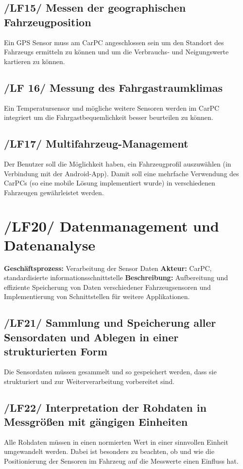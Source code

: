 \subsection{/LF15/ Messen der geographischen Fahrzeugposition}
\nextline
Ein GPS Sensor muss am CarPC angeschlossen sein um den Standort des Fahrzeugs ermitteln zu können und um die Verbrauchs- und Neigungswerte kartieren zu können.

\subsection{/LF 16/ Messung des Fahrgastraumklimas}
\nextline
Ein Temperatursensor und mögliche weitere Sensoren werden im CarPC integriert um die Fahrgastbequemlichkeit besser beurteilen zu können.

\subsection{/LF17/ Multifahrzeug-Management}
\nextline
Der Benutzer soll die Möglichkeit haben, ein Fahrzeugprofil auszuwählen (in Verbindung mit der Android-App). Damit soll eine mehrfache Verwendung des CarPCs (so eine mobile Lösung implementiert wurde) in verschiedenen Fahrzeugen gewährleistet werden.
\newpage

\section{/LF20/ Datenmanagement und Datenanalyse}
\textbf{Geschäftsprozess:}	Verarbeitung der Sensor Daten
\newline
\textbf{Akteur:}		CarPC, standardisierte informationsschnittstelle
\newline
\textbf{Beschreibung:} Aufbereitung und effiziente Speicherung von Daten verschiedener Fahrzeugsensoren und Implementierung von Schnittstellen für weitere Applikationen. 

\subsection{/LF21/ Sammlung und Speicherung aller Sensordaten und Ablegen in einer strukturierten Form}
\nextline
Die Sensordaten müssen gesammelt und so gespeichert werden, dass sie strukturiert und zur Weiterverarbeitung vorbereitet sind.

\subsection{/LF22/ Interpretation der Rohdaten in Messgrößen mit gängigen Einheiten}
\nextline
Alle Rohdaten müssen in einen normierten Wert in einer sinnvollen Einheit umgewandelt werden. Dabei ist besonders zu beachten, ob und wie die Positionierung der Sensoren im Fahrzeug auf die Messwerte einen Einfluss hat.

